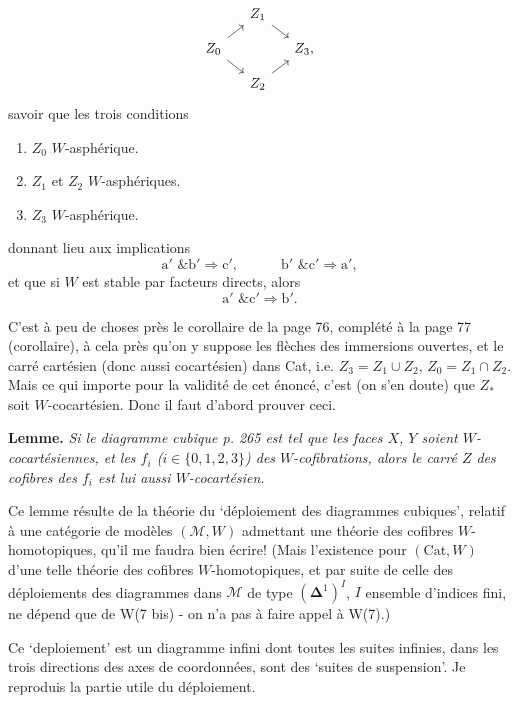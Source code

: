\documentclass[11pt]{article}
\newcommand{\msp}[1]{\marginpar{\footnotesize [#1]}}
\begin{document}
\[
\begin{tikzcd}[row sep=small, column sep=small]
 & Z_1 \arrow[dr] & \\
Z_0 \arrow[ur] \arrow[dr] & & Z_3, \\
 & Z_2 \arrow[ur] &
\end{tikzcd}
\]
savoir que les trois conditions
\begin{enumerate}[label={}]
\item[a$'$)] $Z_0$ $W$-asphérique.
\item[b$'$)] $Z_1$ et $Z_2$ $W$-asphériques.
\item[c$'$)] $Z_3$ $W$-asphérique.
\end{enumerate}
donnant lieu aux implications
\[
\mathrm{a}' \text{ \& } \mathrm{b}' \Longrightarrow \mathrm{c}', \qquad\quad \mathrm{b}' \text{ \& } \mathrm{c}' \Longrightarrow \mathrm{a}',
\]
et que si $W$ est stable par facteurs directs, alors
\[
\mathrm{a}' \text{ \& } \mathrm{c}' \Longrightarrow \mathrm{b}'.
\]

C'est à peu de choses près le corollaire de la page 76, complété à la page 77 (corollaire), à cela près qu'on y suppose les flèches des immersions ouvertes, et le carré cartésien (donc aussi cocartésien) dans Cat, i.e. $Z_3 = Z_1 \cup Z_2$, $Z_0 = Z_1 \cap Z_2$. Mais
\msp{page 268}
ce qui importe pour la validité de cet énoncé, c'est (on s'en doute) que $Z_*$ soit $W$-cocartésien. Donc il faut d'abord prouver ceci.

\textbf{Lemme.} \textit{Si le diagramme cubique p. 265 est tel que les faces $X$, $Y$ soient $W$-cocartésiennes, et les $f_i$ ($i \in \{0,1,2,3\}$) des $W$-cofibrations, alors le carré $Z$ des cofibres des $f_i$ est lui aussi $W$-cocartésien.}

Ce lemme résulte de la théorie du `déploiement des diagrammes cubiques', relatif à une catégorie de modèles $(\mathcal{M}, W)$ admettant une théorie des cofibres $W$-homotopiques, qu'il me faudra bien écrire! (Mais l'existence pour $(\mathrm{Cat}, W)$ d'une telle théorie des cofibres $W$-homotopiques, et par suite de celle des déploiements des diagrammes dans $\mathcal{M}$ de type $(\boldsymbol{\Delta}^1)^I$, $I$ ensemble d'indices fini, ne dépend que de W(7 bis) - on n'a pas à faire appel à W(7).)

\msp{page 269}
Ce `deploiement' est un diagramme infini dont toutes les suites infinies, dans les trois directions des axes de coordonnées, sont des `suites de suspension'. Je reproduis la partie utile du déploiement. %
\end{document}
